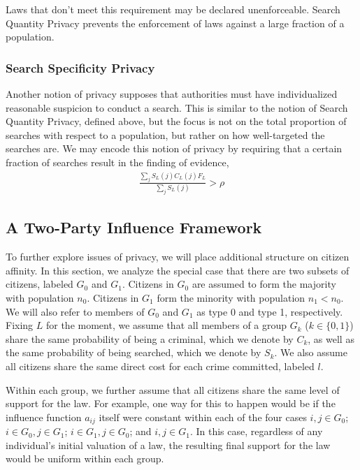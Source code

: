 Laws that don't meet this requirement may be declared unenforceable.  Search Quantity Privacy prevents the enforcement of laws against a large fraction of a population.


\subsubsection{Search Specificity Privacy}

Another notion of privacy supposes that authorities must have individualized reasonable suspicion to conduct a search.  This is similar to the notion of Search Quantity Privacy, defined above, but the focus is not on the total proportion of searches with respect to a population, but rather on how well-targeted the searches are.  We may encode this notion of privacy by requiring that a certain fraction of searches result in the finding of evidence,
\begin{align}
\frac{\sum_j S_L(j)C_L(j)F_L}{\sum_j S_L(j)} > \rho
\end{align}



\subsection{A Two-Party Influence Framework}

To further explore issues of privacy, we will place additional structure on citizen affinity.  In this section, we analyze the special case that there are two subsets of citizens, labeled $G_0$ and $G_1$.  Citizens in $G_0$ are assumed to form the majority with population $n_0$.  Citizens in $G_1$ form the minority with population $n_1 < n_0$.  We will also refer to members of $G_0$ and $G_1$ as type 0 and type 1, respectively.  
Fixing $L$ for the moment, we assume that all members of a group $G_k$ ($k\in \{0,1\}$) share the same probability of being a criminal, which we denote by $C_k$, as well as the same probability of being searched, which we denote by $S_k$.  We also assume all citizens share the same direct cost for each crime committed, labeled $l$.

Within each group, we further assume that all citizens share the same level of support for the law.  For example, one way for this to happen would be if the influence function $a_{ij}$ itself were constant within each of the four cases $i,j \in G_0$; $i \in G_0, j \in G_1$; $i \in G_1, j \in G_0$; and $i,j \in G_1$. In this case, regardless of any individual's initial valuation of a law, the resulting final support for the law would be uniform within each group.

